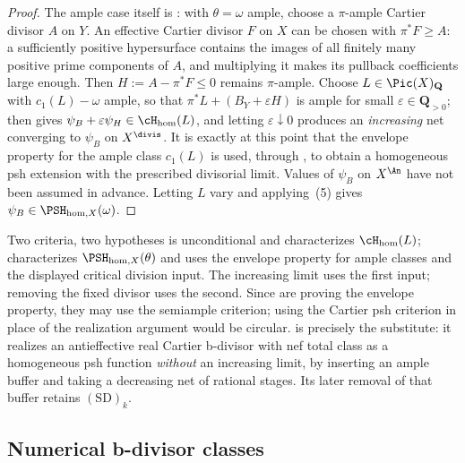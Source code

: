 \begin{proof}
The ample case itself is \cite[Theorem~6.35]{BJ22}: with
$\theta=\omega$ ample, choose a $\pi$-ample Cartier divisor $A$ on $Y$. An effective Cartier divisor
$F$ on $X$ can be chosen with $\pi^*F\geq A$: a sufficiently positive
hypersurface contains the images of all finitely many positive prime
components of $A$, and multiplying it makes its pullback coefficients large
enough. Then $H:=A-\pi^*F\leq0$ remains $\pi$-ample. Choose
$L\in\Pic(X)_{\mathbf Q}$ with $c_1(L)-\omega$ ample, so that
$\pi^*L+(B_Y+\varepsilon H)$ is ample for small
$\varepsilon\in\mathbf Q_{>0}$;  then
gives $\psi_B+\varepsilon\psi_H\in\cH_{\mathrm{hom}}(L)$, and letting
$\varepsilon\downarrow0$ produces an \emph{increasing} net converging to
$\psi_B$ on $X^{\divis}$.  It is exactly at this point that the envelope
property for the ample class $c_1(L)$ is used, through
\cite[Theorem~5.11\,(iii)]{BJ22}, to obtain a homogeneous psh extension with the prescribed divisorial
limit. Values of $\psi_B$ on $X^{\An}$ have not been assumed in advance.
Letting $L$ vary and applying
\,(5) gives
$\psi_B\in\PSH_{\mathrm{hom},X}(\omega)$.
\end{proof}

\begin{warning}{Two criteria, two hypotheses}
 is unconditional and characterizes
$\cH_{\mathrm{hom}}(L)$; 
characterizes $\PSH_{\mathrm{hom},X}(\theta)$ and uses the envelope
property for ample classes and the displayed critical division input.
The increasing limit uses the first input; removing the fixed divisor
uses the second. Since
are proving the envelope property, they may use the semiample criterion;
using the Cartier psh criterion in place of the realization argument would
be circular.  is precisely the
substitute: it realizes an antieffective real Cartier b-divisor with nef
total class as a homogeneous psh function \emph{without} an increasing
limit, by inserting an ample buffer and taking a decreasing net of rational
stages. Its later removal of that buffer retains $\mathrm{(SD)}_k$.
\end{warning}

\subsection{Numerical b-divisor classes}
\label{sec:ch35-numerical-bclasses}

